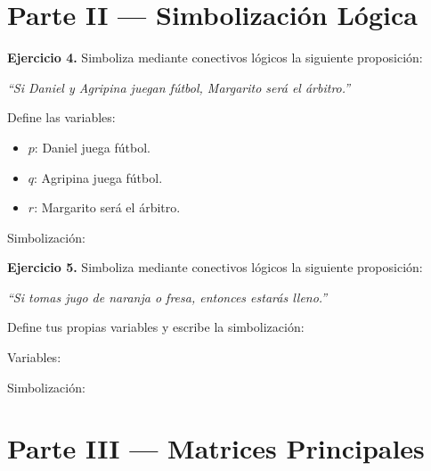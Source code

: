 \documentclass[12pt,a4paper]{article}
\newcommand{\linea}{\underline{\hspace{10cm}}}
\newcommand{\espacioresp}[1][3cm]{\vspace{#1}}
\begin{document}
\espacioresp[1.5cm]

\section{Parte II — Simbolización Lógica}

\begin{ejerciciobox}
\textbf{Ejercicio 4.}
Simboliza mediante conectivos lógicos la siguiente proposición:

\begin{center}
  \textit{``Si Daniel y Agripina juegan fútbol, Margarito será el árbitro.''}
\end{center}

Define las variables:
\begin{itemize}
  \item $p$: Daniel juega fútbol.
  \item $q$: Agripina juega fútbol.
  \item $r$: Margarito será el árbitro.
\end{itemize}

Simbolización: \linea
\end{ejerciciobox}

\espacioresp[2cm]

\begin{ejerciciobox}
\textbf{Ejercicio 5.}
Simboliza mediante conectivos lógicos la siguiente proposición:

\begin{center}
  \textit{``Si tomas jugo de naranja o fresa, entonces estarás lleno.''}
\end{center}

Define tus propias variables y escribe la simbolización:

\vspace{0.5cm}
Variables: \linea

Simbolización: \linea
\end{ejerciciobox}

\espacioresp[2cm]

\section{Parte III — Matrices Principales}
\end{document}
